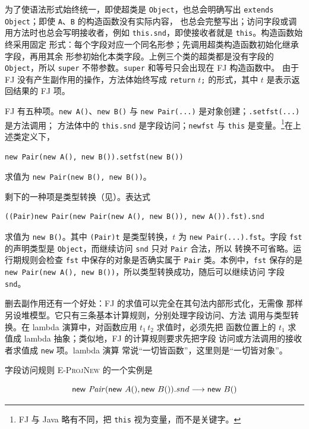为了使语法形式始终统一，即使超类是 \texttt{Object}，也总会明确写出
\texttt{extends Object}；即使 \texttt{A}、\texttt{B} 的构造函数没有实际内容，
也总会完整写出；访问字段或调用方法时也总会写明接收者，例如
\texttt{this.snd}，即使接收者就是 \texttt{this}。构造函数始终采用固定
形式：每个字段对应一个同名形参；先调用超类构造函数初始化继承字段，再用其余
形参初始化本类字段。上例三个类的超类都是没有字段的 \texttt{Object}，所以
\texttt{super} 不带参数。\texttt{super} 和等号只会出现在 FJ 构造函数中。
由于 FJ 没有产生副作用的操作，方法体始终写成 \texttt{return} \(t\)\texttt{;}
的形式，其中 \(t\) 是表示返回结果的 FJ 项。

FJ 有五种项。\texttt{new A()}、\texttt{new B()} 与
\texttt{new Pair(...)} 是对象创建；\texttt{.setfst(...)} 是方法调用；
方法体中的 \texttt{this.snd} 是字段访问；\texttt{newfst} 与
\texttt{this} 是变量。\footnote{FJ 与 Java 略有不同，把 \texttt{this}
视为变量，而不是关键字。}在上述类定义下，

\begin{lstlisting}
new Pair(new A(), new B()).setfst(new B())
\end{lstlisting}

求值为 \texttt{new Pair(new B(), new B())}。

剩下的一种项是类型转换（见）。表达式

\begin{lstlisting}
((Pair)new Pair(new Pair(new A(), new B()), new A()).fst).snd
\end{lstlisting}

求值为 \texttt{new B()}。其中 \texttt{(Pair)t} 是类型转换，\(t\) 为
\texttt{new Pair(...).fst}。字段 \texttt{fst} 的声明类型是
\texttt{Object}，而继续访问 \texttt{snd} 只对 \texttt{Pair} 合法，所以
转换不可省略。运行期规则会检查 \texttt{fst} 中保存的对象是否确实属于
\texttt{Pair} 类。本例中，\texttt{fst} 保存的是
\texttt{new Pair(new A(), new B())}，所以类型转换成功，随后可以继续访问
字段 \texttt{snd}。

删去副作用还有一个好处：FJ 的求值可以完全在其句法内部形式化，无需像
那样另设堆模型。它只有三条基本计算规则，分别处理字段访问、方法
调用与类型转换。在 lambda 演算中，对函数应用 \(t_1\,t_2\) 求值时，必须先把
函数位置上的 \(t_1\) 求值成 lambda 抽象；类似地，FJ 的计算规则要求先把字段
访问或方法调用的接收者求值成 \texttt{new} 项。lambda 演算
常说“一切皆函数”，这里则是“一切皆对象”。

字段访问规则 \textsc{E-ProjNew} 的一个实例是

\[
\mathsf{new}\ \mathit{Pair}(\mathsf{new}\ A(),\mathsf{new}\ B()).snd
\trans \mathsf{new}\ B()
\]

